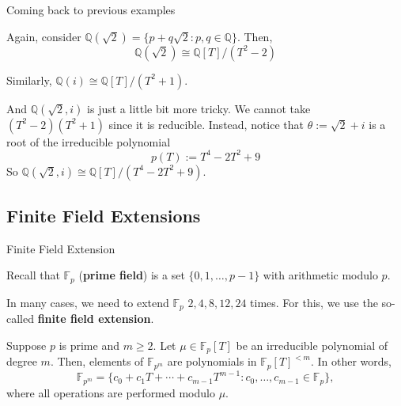 \documentclass{zkdl-presentation-template}
\begin{document}
    \begin{frame}{Coming back to previous examples}
        \begin{example}
            Again, consider $\mathbb{Q}(\sqrt{2}) = \{p+q\sqrt{2}: p,q \in \mathbb{Q}\}$. Then,
            \begin{equation*}
                \mathbb{Q}(\sqrt{2}) \cong \mathbb{Q}[T]/(T^2-2)
            \end{equation*}
        \end{example}\pause

        \begin{example}
            Similarly, $\mathbb{Q}(i) \cong \mathbb{Q}[T]/(T^2+1)$.
        \end{example}\pause

        \begin{example}
            And $\mathbb{Q}(\sqrt{2}, i)$ is just a little bit more tricky. We cannot take $(T^2-2)(T^2+1)$ since it is reducible. Instead, notice that $\theta := \sqrt{2}+i$ is a root of the irreducible polynomial
            \begin{equation*}
                p(T) := T^4-2T^2+9
            \end{equation*}
            So $\mathbb{Q}(\sqrt{2}, i) \cong \mathbb{Q}[T]/(T^4-2T^2+9)$.
        \end{example}
    \end{frame}

    \subsection{Finite Field Extensions}

    \begin{frame}{Finite Field Extension}
        \begin{definition}
            Recall that $\mathbb{F}_p$ (\textbf{prime field}) is a set $\{0,1,\dots,p-1\}$ with arithmetic modulo $p$.\pause
        \end{definition}

        In many cases, we need to extend $\mathbb{F}_p$ $2,4,8,12,24$ times. For this, we use the so-called \textbf{finite field extension}.\pause

        \begin{definition}
            Suppose $p$ is prime and $m \geq 2$. Let $\mu \in \mathbb{F}_p[T]$ be an irreducible polynomial of degree $m$. Then, elements of $\mathbb{F}_{p^m}$ are polynomials in $\mathbb{F}_p[T]^{<m}$. In other words,
            \begin{equation*}
                \mathbb{F}_{p^m} = \{c_0+c_1T+\cdots+c_{m-1}T^{m-1}: c_0,\dots,c_{m-1} \in \mathbb{F}_p\},
            \end{equation*}
            where all operations are performed modulo $\mu$.
        \end{definition}
    \end{frame}
\end{document}

